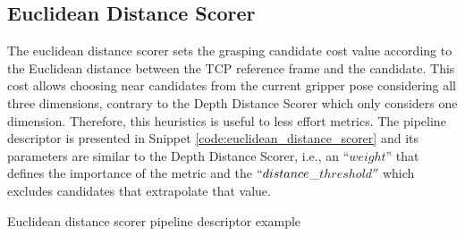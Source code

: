 \subsection{Euclidean Distance Scorer}
\label{cap4:modular_grasping_architecture:sec:grasp_selection:subsec:euclidean_distance}

The euclidean distance scorer sets the grasping candidate cost value according to the Euclidean distance between the TCP  reference frame and the candidate. This cost allows choosing near candidates from the current gripper pose considering all three dimensions, contrary to the Depth Distance Scorer which only considers one dimension. Therefore, this heuristics is useful to less effort metrics. The pipeline descriptor is presented in Snippet \ref{code:euclidean_distance_scorer} and its parameters are similar to the Depth Distance Scorer, i.e., an ``$weight$'' that defines the importance of the metric and the $``distance$\_$threshold''$ which excludes candidates that extrapolate that value.




\begin{snippet}[h!]
\centering
{}
\caption{Euclidean distance scorer pipeline descriptor example}
\label{code:euclidean_distance_scorer}
\end{snippet}

